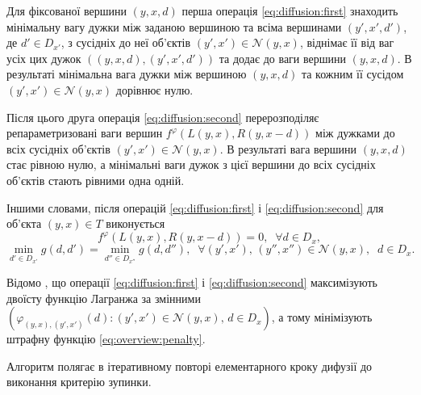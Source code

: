 Для фіксованої вершини $\left( y, x, d \right)$ перша операція
\ref{eq:diffusion:first} знаходить мінімальну вагу дужки між заданою вершиною
та всіма вершинами $\left( y', x', d'\right)$,
де $d' \in D_{x'}$,
з сусідніх до неї об'єктів
$\left(y', x' \right) \in \mathcal{N} \left(y, x \right)$,
віднімає її від ваг усіх цих дужок
$\left( \left(y, x, d\right), \left( y', x', d'\right)\right)$
та додає до ваги вершини $\left(y, x, d \right)$.
В результаті мінімальна вага дужки між вершиною $\left( y, x, d \right)$
та кожним її сусідом $\left(y', x' \right) \in \mathcal{N} \left(y, x \right)$
дорівнює нулю.

Після цього друга операція \ref{eq:diffusion:second}
перерозподіляє репараметризовані ваги вершин
$f^{\varphi} \left(
    L \left(y, x \right) , R \left(y, x - d \right)
\right) $
між дужками до всіх сусідніх об'єктів
$\left(y', x' \right) \in \mathcal{N} \left(y, x \right)$.
В результаті вага вершини $ \left( y, x, d \right)$ стає рівною нулю,
а мінімальні ваги дужок з цієї вершини до всіх сусідніх об'єктів стають
рівними одна одній.

Іншими словами, після операцій \ref{eq:diffusion:first} і
\ref{eq:diffusion:second} для об'єкта $\left(y, x \right) \in T$ виконується
\begin{equation*}
    f^{\varphi} \left(
        L \left(y, x\right) , R \left(y, x - d \right)
    \right) = 0, \; \; \forall d \in D_x,
\end{equation*}
\begin{equation*}
    \min \limits_{d' \in D_{x'}} g \left( d, d' \right)
    = \min \limits_{d'' \in D_{x''}} g \left( d, d'' \right), \; \;
    \forall \left(y', x' \right), \,
        \left(y'', x'' \right) \in \mathcal{N} \left(y, x \right), \; \;
    d \in D_x.
\end{equation*}


Відомо \cite{overview:savchynskyy:diffusion},
що операції \ref{eq:diffusion:first} і
\ref{eq:diffusion:second} максимізують двоїсту функцію Лагранжа за змінними
$\left(
    \varphi_{\left(y, x \right), \left(y', x' \right)} \left(d \right) :
    \left(y', x' \right) \in \mathcal{N} \left(y, x \right), \,
    d \in D_x
\right)$, а тому мінімізують штрафну функцію \ref{eq:overview:penalty}.

Алгоритм полягає в ітеративному повторі елементарного кроку дифузії до виконання
критерію зупинки.

